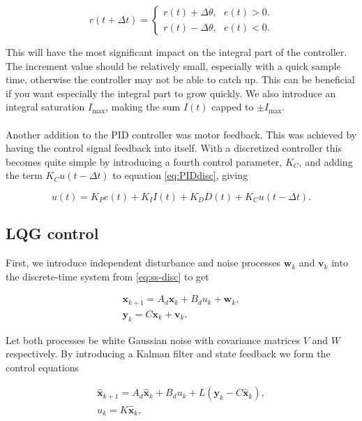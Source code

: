 \begin{equation}\label{eq:ref-adjustment}
    r(t+\Delta t) =
    \begin{cases}
        r(t) + \Delta\theta, \ \ \ e(t) > 0. \\
        r(t) - \Delta\theta, \ \ \ e(t) < 0.
    \end{cases}
\end{equation}

\noindent
This will have the most significant impact on the integral part of the controller. The increment value should be relatively small, especially with a quick sample time, otherwise the controller may not be able to catch up. This can be beneficial if you want especially the integral part to grow quickly. We also introduce an integral saturation $I_{\text{max}}$, making the sum $I(t)$ capped to $\pm I_{\text{max}}$.
\\\\
Another addition to the PID controller was motor feedback. This was achieved by having the control signal feedback into itself. With a discretized controller this becomes quite simple by introducing a fourth control parameter, $K_C$, and adding the term $K_Cu(t-\Delta t)$ to equation \eqref{eq:PIDdisc}, giving

\begin{equation}\label{eq:PIDCdisc}
    u(t) = K_P e(t) + K_I I(t) + K_D D(t) + K_C u(t-\Delta t).
\end{equation}

\subsection{LQG control}
First, we introduce independent disturbance and noise processes $\mathbf{w}_k$ and $\mathbf{v
}_k$ into the discrete-time system from \eqref{eq:ss-disc} to get

\begin{equation}
    \begin{gathered}
        \mathbf{x}_{k+1} = A_d\mathbf{x}_k + B_du_k + \mathbf{w}_k, \\
        \mathbf{y}_k = C\mathbf{x}_k + \mathbf{v}_k.
    \end{gathered}
\end{equation}

\noindent
Let both processes be white Gaussian noise with covariance matrices $V$ and $W$ respectively. By introducing a Kalman filter and state feedback we form the control equations

\begin{equation}\label{eq:LQG}
    \begin{gathered}
        \hat{\mathbf{x}}_{k+1} = A_d\hat{\mathbf{x}}_k + B_du_k + L(\mathbf{y}_k - C\hat{\mathbf{x}}_k),\\
        u_k = K\hat{\mathbf{x}}_k,
    \end{gathered}
\end{equation}

